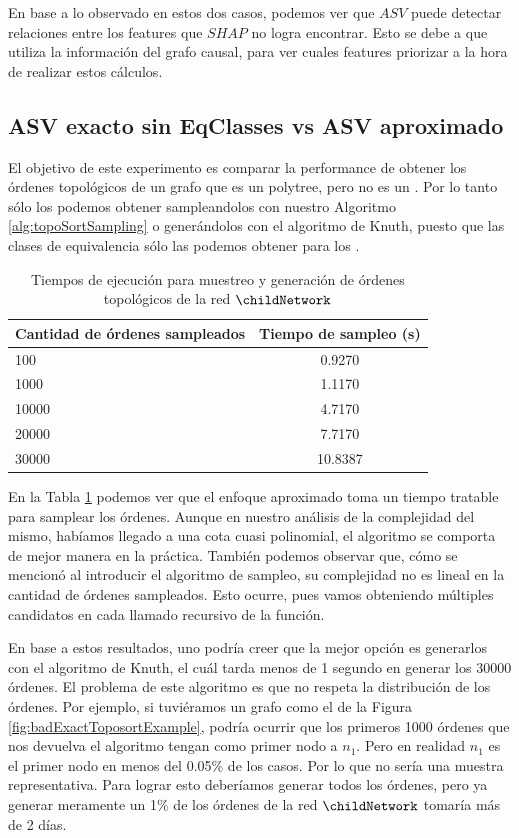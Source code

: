 En base a lo observado en estos dos casos, podemos ver que $ASV$ puede detectar relaciones entre los features que $SHAP$ no logra encontrar. Esto se debe a que utiliza la información del grafo causal, para ver cuales features priorizar a la hora de realizar estos cálculos. 

\subsection{ASV exacto sin EqClasses vs ASV aproximado}

El objetivo de este experimento es comparar la performance de obtener los órdenes topológicos de un grafo que es un polytree, pero no es un \dtree. Por lo tanto sólo los podemos obtener sampleandolos con nuestro Algoritmo \ref{alg:topoSortSampling} o generándolos con el algoritmo de Knuth, puesto que las clases de equivalencia sólo las podemos obtener para los \dtrees.

\begin{table}[h]
\centering
\begin{tabular}{|l|c|}
\hline
\textbf{Cantidad de órdenes sampleados} & \textbf{Tiempo de sampleo (s)}\\
    \hline
    100 & 0.9270 \\
    1000 & 1.1170 \\
    10000 & 4.7170 \\
    20000 & 7.7170 \\
    30000 & 10.8387 \\
    \hline
    \end{tabular}

\caption{Tiempos de ejecución para muestreo y generación de órdenes topológicos de la red $\childNetwork$}
\label{table:exactVsApproximateTopoSorts}
\end{table}

En la Tabla \ref{table:exactVsApproximateTopoSorts} podemos ver que el enfoque aproximado toma un tiempo tratable para samplear los órdenes. Aunque en nuestro análisis de la complejidad del mismo, habíamos llegado a una cota cuasi polinomial, el algoritmo se comporta de mejor manera en la práctica. También podemos observar que, cómo se mencionó al introducir el algoritmo de sampleo, su complejidad no es lineal en la cantidad de órdenes sampleados. Esto ocurre, pues vamos obteniendo múltiples candidatos en cada llamado recursivo de la función. 

En base a estos resultados, uno podría creer que la mejor opción es generarlos con el algoritmo de Knuth, el cuál tarda menos de 1 segundo en generar los 30000 órdenes. El problema de este algoritmo es que no respeta la distribución de los órdenes.  Por ejemplo, si tuviéramos un grafo como el de la Figura \ref{fig:badExactToposortExample}, podría ocurrir que los primeros 1000 órdenes que nos devuelva el algoritmo tengan como primer nodo a $n_1$. Pero en realidad $n_1$ es el primer nodo en menos del 0.05\% de los casos. Por lo que no sería una muestra representativa. Para lograr esto deberíamos generar todos los órdenes, pero ya generar meramente un 1\% de los órdenes de la red $\childNetwork$ tomaría más de 2 días. 


